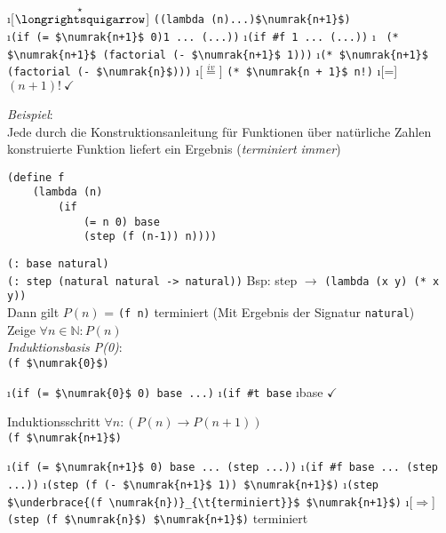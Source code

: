 \begin{enumerate}[\eval]
\i[$\overset{\star}{\text{\eval}}$] \lstinline[mathescape]|((lambda (n)...)$\numrak{n+1}$)|\\
\i \lstinline[mathescape]|(if (= $\numrak{n+1}$ 0)1 ... (...))|
\i \lstinline[]|(if #f|\lstinline| 1 ... (...))|
\i \ \marginpar{\flushleft \textcolor{red}{Unter der Annahme, dass tatsächlich Subtraktion implementiert ist}} \lstinline[mathescape]|(* $\numrak{n+1}$ (factorial (- $\numrak{n+1}$ 1)))|
\i \lstinline[mathescape]|(* $\numrak{n+1}$ (factorial (- $\numrak{n}$)))|
\i[$\overset{iv}{=}$] \lstinline[mathescape]|(* $\numrak{n + 1}$ n!)|
\i[=]$(n+1)!\ \checkmark$
\end{enumerate}
\emph{Beispiel}:\\
Jede durch die Konstruktionsanleitung für Funktionen über natürliche Zahlen konstruierte Funktion liefert ein Ergebnis ({\em terminiert immer})\\
\begin{lstlisting}
(define f
	(lambda (n)
		(if
			(= n 0) base
			(step (f (n-1)) n))))
\end{lstlisting}
\lstinline|(: base natural)|\\
\lstinline|(: step (natural natural -> natural))|
Bsp: step $\rightarrow$ \lstinline|(lambda (x y) (* x y))|\\
Dann gilt $P(n)$ = \lstinline!(f n)! terminiert (Mit Ergebnis der Signatur \lstinline!natural!)\\
Zeige $\forall n \in \mathbb{N} : P(n)$\\
\emph{Induktionsbasis P(0)}:\\
\lstinline[mathescape]|(f $\numrak{0}$)|
\begin{enumerate}[\eval]
\i \lstinline[mathescape]|(if (= $\numrak{0}$ 0) base ...)|
\i \lstinline[]|(if #t base|
\i base $\checkmark $
\end{enumerate}
Induktionsschritt $\forall n : (P(n) \rightarrow P(n+1))$\\
\lstinline[mathescape]|(f $\numrak{n+1}$)|
\begin{enumerate}[\eval]
	\i \lstinline[mathescape]|(if (= $\numrak{n+1}$ 0) base ... (step ...))|
	\i \lstinline[]|(if #f|\lstinline| base ... (step ...))|
	\i \lstinline[mathescape]|(step (f (- $\numrak{n+1}$ 1)) $\numrak{n+1}$)|
	\i \lstinline[mathescape]|(step $\underbrace{(f \numrak{n})}_{\t{terminiert}}$ $\numrak{n+1}$)|
	\i[$\Rightarrow$]\lstinline[mathescape]!(step (f $\numrak{n}$) $\numrak{n+1}$)! terminiert
\end{enumerate}
